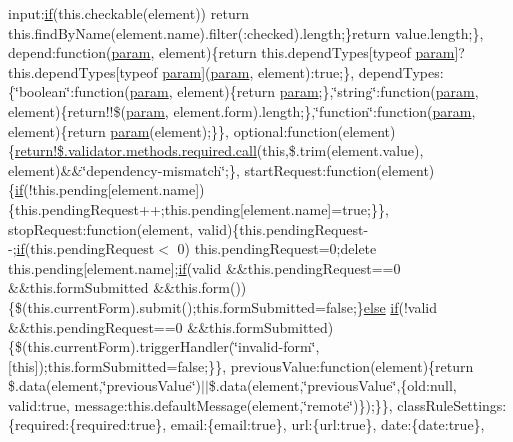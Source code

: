 \begin{DoxyCompactItemize}
\textquotesingle{}input\textquotesingle{}\+:\hyperlink{_scripts_2respond_8min_8js_a93851d60dd037a83509a1757b9ee7b66}{if}(this.\+checkable(element)) return this.\+find\+By\+Name(element.\+name).filter(\textquotesingle{}\+:checked\textquotesingle{}).length;\}return value.\+length;\}, depend\+:function(\hyperlink{_scripts_2jquery-1_810_82_8min_8js_ae8915303d11557d1b001bc56b6195251}{param}, element)\{return this.\+depend\+Types\mbox{[}typeof \hyperlink{_scripts_2jquery-1_810_82_8min_8js_ae8915303d11557d1b001bc56b6195251}{param}\mbox{]}?this.\+depend\+Types\mbox{[}typeof \hyperlink{_scripts_2jquery-1_810_82_8min_8js_ae8915303d11557d1b001bc56b6195251}{param}\mbox{]}(\hyperlink{_scripts_2jquery-1_810_82_8min_8js_ae8915303d11557d1b001bc56b6195251}{param}, element)\+:true;\}, depend\+Types\+:\{\char`\"{}boolean\char`\"{}\+:function(\hyperlink{_scripts_2jquery-1_810_82_8min_8js_ae8915303d11557d1b001bc56b6195251}{param}, element)\{return \hyperlink{_scripts_2jquery-1_810_82_8min_8js_ae8915303d11557d1b001bc56b6195251}{param};\},\char`\"{}string\char`\"{}\+:function(\hyperlink{_scripts_2jquery-1_810_82_8min_8js_ae8915303d11557d1b001bc56b6195251}{param}, element)\{return!!\$(\hyperlink{_scripts_2jquery-1_810_82_8min_8js_ae8915303d11557d1b001bc56b6195251}{param}, element.\+form).length;\},\char`\"{}function\char`\"{}\+:function(\hyperlink{_scripts_2jquery-1_810_82_8min_8js_ae8915303d11557d1b001bc56b6195251}{param}, element)\{return \hyperlink{_scripts_2jquery-1_810_82_8min_8js_ae8915303d11557d1b001bc56b6195251}{param}(element);\}\}, optional\+:function(element)\{\hyperlink{_scripts_2dropzone_8js_aafc46d047b4d7639fd2c4b927ec5048c}{return!\$.\+validator.\+methods.\+required.\+call}(this,\$.trim(element.\+value), element)\&\&\char`\"{}dependency-\/mismatch\char`\"{};\}, start\+Request\+:function(element)\{\hyperlink{_scripts_2respond_8min_8js_a93851d60dd037a83509a1757b9ee7b66}{if}(!this.\+pending\mbox{[}element.\+name\mbox{]})\{this.\+pending\+Request++;this.\+pending\mbox{[}element.\+name\mbox{]}=true;\}\}, stop\+Request\+:function(element, valid)\{this.\+pending\+Request-\/-\/;\hyperlink{_scripts_2respond_8min_8js_a93851d60dd037a83509a1757b9ee7b66}{if}(this.\+pending\+Request$<$ 0) this.\+pending\+Request=0;delete this.\+pending\mbox{[}element.\+name\mbox{]};\hyperlink{_scripts_2respond_8min_8js_a93851d60dd037a83509a1757b9ee7b66}{if}(valid \&\&this.\+pending\+Request==0 \&\&this.\+form\+Submitted \&\&this.\+form())\{\$(this.\+current\+Form).submit();this.\+form\+Submitted=false;\}\hyperlink{_scripts_2jquery_8validate_8js_a0544c3fe466e421738dae463968b70ba}{else} \hyperlink{_scripts_2respond_8min_8js_a93851d60dd037a83509a1757b9ee7b66}{if}(!valid \&\&this.\+pending\+Request==0 \&\&this.\+form\+Submitted)\{\$(this.\+current\+Form).trigger\+Handler(\char`\"{}invalid-\/form\char`\"{}, \mbox{[}this\mbox{]});this.\+form\+Submitted=false;\}\}, previous\+Value\+:function(element)\{return \$.data(element,\char`\"{}previous\+Value\char`\"{})$\vert$$\vert$\$.data(element,\char`\"{}previous\+Value\char`\"{},\{old\+:null, valid\+:true, message\+:this.\+default\+Message(element,\char`\"{}remote\char`\"{})\});\}\}, class\+Rule\+Settings\+:\{required\+:\{required\+:true\}, email\+:\{email\+:true\}, url\+:\{url\+:true\}, date\+:\{date\+:true\}, 
\end{DoxyCompactItemize}
